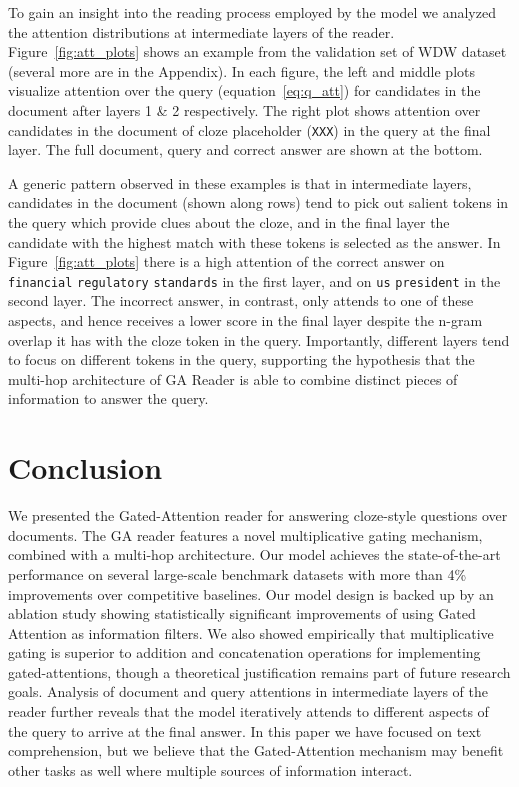 \documentclass[11pt,a4paper]{article}
\begin{document}
To gain an insight into the reading process employed by the model we analyzed the attention distributions at intermediate layers of the reader.
Figure~\ref{fig:att_plots} shows an example from the validation set of WDW dataset (several more are in the Appendix).
In each figure, the left and middle plots visualize attention over the query (equation~\ref{eq:q_att}) for candidates in the document after layers 1 \& 2 respectively. The right plot shows attention over candidates in the document of cloze placeholder (\texttt{XXX}) in the query at the final layer.
The full document, query and correct answer are shown at the bottom.

A generic pattern observed in these examples is that in intermediate layers,
candidates in the document (shown along rows) tend to pick out salient tokens in the query which provide clues about the cloze, and in the final layer the candidate with the highest match with these tokens is selected as the answer.
In Figure~\ref{fig:att_plots} there is a high attention of the correct answer on \texttt{financial} \texttt{regulatory} \texttt{standards} in the first layer, and on \texttt{us} \texttt{president} in the second layer. The incorrect answer, in contrast, only attends to one of these aspects, and hence receives a lower score in the final layer despite the n-gram overlap it has with the cloze token in the query.
Importantly, different layers tend to focus on different tokens in the query, supporting the hypothesis that the multi-hop architecture of GA Reader is able to combine distinct pieces of information to answer the query.







\section{Conclusion}
\label{sec:conclusion}
We presented the Gated-Attention reader for answering cloze-style questions over documents.
The GA reader features a novel multiplicative gating mechanism, combined with a multi-hop architecture.
Our model achieves the state-of-the-art performance on several large-scale benchmark datasets with more than 4\% improvements over competitive baselines. Our model design is backed up by an ablation study showing statistically significant improvements of using Gated Attention as information filters. We also showed empirically that multiplicative gating is superior to addition and concatenation operations for implementing gated-attentions, though a theoretical justification remains part of future research goals. Analysis of document and query attentions in intermediate layers of the reader further reveals that the model iteratively attends to different aspects of the query to arrive at the final answer. In this paper we have focused on text comprehension, but we believe that the Gated-Attention mechanism may benefit other tasks as well where multiple sources of information interact.
\end{document}
